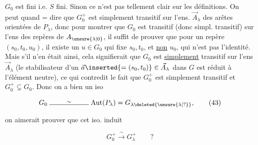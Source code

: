 
$G_0$ est fini i.e. $S$ fini. Sinon ce n'est pas tellement clair sur les définitions. On peut quand = dire que  $G_0^+$ est simplement transitif sur l'ens. $\vec A_\lambda$ des arêtes orientées de  $P_\lambda$, donc  pour montrer que $G_0$ est transitif (donc  simpl. transitif) sur l'ens des repères de $A_{\unsure{\lambda|0}}$,   il suffit de prouver que pour  un repère $(s_0,t_0,u_0)$, il existe un $u\in G_0$  qui fixe $s_0,t_0$, et \uline{non} $u_0$,  qui n'est pas l'identité. Mais s'il n'en était ainsi, cela signifierait que $G_0$ est \uline{simplement} transitif sur l'ens $\vec A_\lambda$ (le stabilisateur d'un $\vec a\inserted{=(s_0,t_0)}\in\vec A_\lambda$ dans $G$ est réduit à l'élément neutre), ce qui contredit le fait que $G_0^+$ est simplement transitif et  $G_0^+\subsetneq G_0$. Donc on a bien un iso

\[
G_0\mathrel{\overset{\sim}{\rule{2cm}{0.4pt}}}\operatorname{Aut}(P_\lambda)=G_{\lambda\deleted{\unsure{\lambda|?}}},
\tag*{$(43)$}
\]

on aimerait prouver que cet iso. induit

\[
G_0^+\xrightarrow{\ \sim\ }G_\lambda^+\qquad ?
\tag*{$(44)$}
\]
